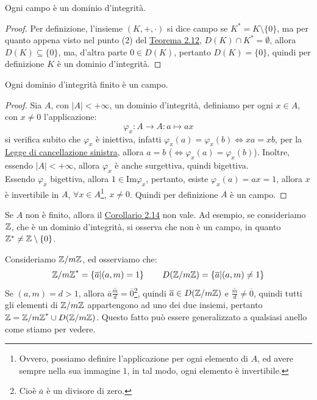 \documentclass[11pt]{scrartcl}
\begin{document}
\begin{corollary}
Ogni campo è un dominio d'integrità.
\end{corollary}

\begin{proof}
Per definizione, l'insieme $(K,+,\cdot)$ si dice campo se $K^*=K \setminus \{0\}$, ma per quanto appena visto nel punto (2) del \hyperref[r:prop]{Teorema 2.12}, $D(K) \cap K^* = \emptyset$, allora $D(K) \subseteq \{0\}$, ma, d'altra parte $0 \in D(K)$, pertanto $D(K)=\{0\}$, quindi per definizione $K$ è un dominio d'integrità.
\end{proof}

\newpage

\begin{corollary}
\label{r:cor2}
Ogni dominio d'integrità finito è un campo.
\end{corollary}

\begin{proof}
Sia $A$, con $|A|<+\infty$, un dominio d'integrità, definiamo per ogni $x \in A$, con $x \neq 0$ l'applicazione:
	\[ \varphi_x : A \longrightarrow A: a \longmapsto ax
	\]
si verifica subito che $\varphi_x$ è iniettiva, infatti $\varphi_x(a) = \varphi_x(b) \iff xa=xb$, per la \hyperref[r:prop]{Legge di cancellazione sinistra}, allora $a=b$ ($\iff \varphi_x(a) = \varphi_x(b)$). Inoltre, essendo $|A|<+\infty$, allora $\varphi_x$ è anche surgettiva, quindi bigettiva.\\
Essendo $\varphi_x$ bigettiva, allora $1 \in \text{Im}\varphi_x$, pertanto, esiste $\varphi_x(a)= ax = 1$, allora $x$ è invertibile in $A$, $\forall x \in A$\footnote{Ovvero, possiamo definire l'applicazione per ogni elemento di $A$, ed avere sempre nella sua immagine $1$, in tal modo, ogni elemento è invertibile.}, $x \ne 0$.
Quindi per definizione $A$ è un campo.
\end{proof}

\begin{remark}
Se $A$ non è finito, allora il \hyperref[r:cor2]{Corollario 2.14} non vale. Ad esempio, se consideriamo $\mathbb Z$, che è un dominio d'integrità, si osserva che non è un campo, in quanto $\mathbb Z^* \neq \mathbb Z \setminus \{0\}$.
\end{remark}

\begin{remark}
Consideriamo ${\mathbb Z}/m{\mathbb Z}$, ed osserviamo che:
	\[ {{\mathbb Z}/m{\mathbb Z}}^{*} = \left\{\overline a \middle| (a,m) = 1\right\}
	\qquad
	 D({\mathbb Z}/m{\mathbb Z}) = \left\{\overline a \middle| (a, m) \neq 1\right\}
	\]
Se $(a,m)=d>1$, allora $\overline a \overline{\frac md} = \overline 0$\footnote{Cioè $\overline a$ è un divisore di zero.}, quindi $\overline a \in D({\mathbb Z}/m{\mathbb Z})$ e $\overline{\frac{m}{d}} \neq \overline0$, quindi tutti gli elementi di ${\mathbb Z}/m{\mathbb Z}$ appartengono ad uno dei due insiemi, pertanto $\mathbb Z={{\mathbb Z}/m{\mathbb Z}}^{*} \cup D({\mathbb Z}/m{\mathbb Z})$. Questo fatto può essere generalizzato a qualsiasi anello come stiamo per vedere.
\end{remark}
\end{document}
